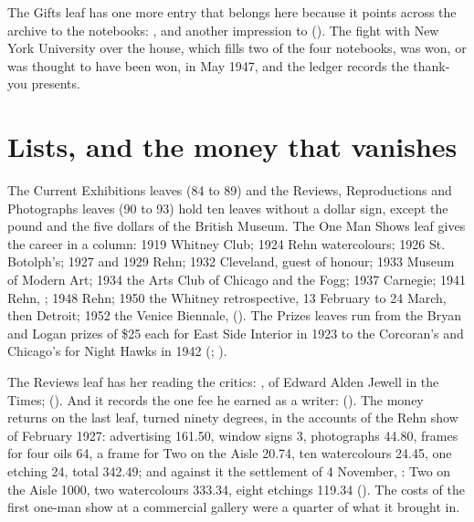 The Gifts leaf has one more entry that belongs here because it points across the archive to the notebooks: , and another impression to  (). The fight with New York University over the house, which fills two of the four notebooks, was won, or was thought to have been won, in May 1947, and the ledger records the thank-you presents.

\section{Lists, and the money that vanishes}

The Current Exhibitions leaves (84 to 89) and the Reviews, Reproductions and Photographs leaves (90 to 93) hold ten leaves without a dollar sign, except the pound and the five dollars of the British Museum. The One Man Shows leaf gives the career in a column: 1919 Whitney Club; 1924 Rehn watercolours; 1926 St. Botolph's; 1927 and 1929 Rehn; 1932 Cleveland, guest of honour; 1933 Museum of Modern Art; 1934 the Arts Club of Chicago and the Fogg; 1937 Carnegie; 1941 Rehn, ; 1948 Rehn; 1950 the Whitney retrospective, 13 February to 24 March, then Detroit; 1952 the Venice Biennale,  (). The Prizes leaves run from the Bryan and Logan prizes of \$25 each for East Side Interior in 1923 to the Corcoran's  and Chicago's  for Night Hawks in 1942 (; ).

The Reviews leaf has her reading the critics: , of Edward Alden Jewell in the Times;  (). And it records the one fee he earned as a writer:  (). The money returns on the last leaf, turned ninety degrees, in the accounts of the Rehn show of February 1927: advertising 161.50, window signs 3, photographs 44.80, frames for four oils 64, a frame for Two on the Aisle 20.74, ten watercolours 24.45, one etching 24, total 342.49; and against it the settlement of 4 November, : Two on the Aisle 1000, two watercolours 333.34, eight etchings 119.34 (). The costs of the first one-man show at a commercial gallery were a quarter of what it brought in.

